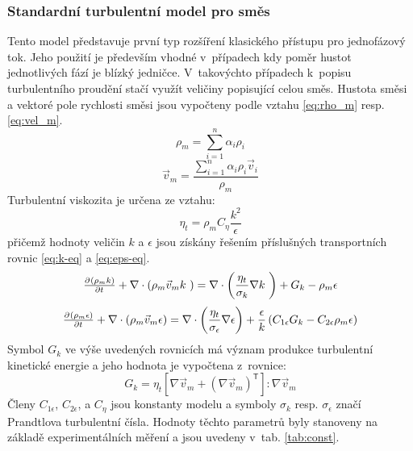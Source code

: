 \subsubsection{Standardní \kepsb{} turbulentní model pro směs}
Tento model představuje první typ rozšíření klasického \keps{} přístupu pro jednofázový tok. Jeho použití je především vhodné v~případech kdy poměr hustot jednotlivých fází je blízký jedničce. V~takovýchto případech k~popisu turbulentního proudění stačí využít veličiny popisující celou směs. Hustota směsi a vektoré pole rychlosti směsi jsou vypočteny podle vztahu \ref{eq:rho_m} resp. \ref{eq:vel_m}.
\begin{equation}
	\rho_{m} = \sum_{i=1}^n \alpha_{i}\rho_{i}
	\label{eq:rho_m}
\end{equation}  
\begin{equation}
	\vec{v}_{m} = \frac{\sum_{i=1}^n \alpha_{i}\rho_{i}\vec{v}_{i}}{\rho_{m} }
	\label{eq:vel_m}
\end{equation}  
Turbulentní viskozita je určena ze vztahu:
\begin{equation}
	\eta_{t} = \rho_{m}C_{\eta}\frac{k^{2}}{\epsilon}
	\label{eq:turb}
\end{equation}  
přičemž hodnoty veličin $k$ a $\epsilon$ jsou získány řešením příslušných transportních rovnic \ref{eq:k-eq} a \ref{eq:eps-eq}.
\begin{equation}
	\pd{\kula{\rho_{m}k}}{t} +  \nabla  \cdot \left( \rho_{m} \vec{v}_{m} k~\right) = \nabla  \cdot \left( \frac{\eta_{t}}{\sigma_{k}} \nabla k~\right) + G_{k} - \rho_{m}\epsilon
	\label{eq:k-eq}
\end{equation}  
\begin{equation}
	\pd{\kula{\rho_{m}\epsilon}}{t} +  \nabla  \cdot \left( \rho_{m} \vec{v}_{m} \epsilon \right) = \nabla  \cdot \left( \frac{\eta_{t}}{\sigma_{\epsilon}} \nabla \epsilon \right) + \frac{\epsilon}{k} \left( C_{1\epsilon}G_{k} - C_{2\epsilon}\rho_{m}\epsilon \right)
	\label{eq:eps-eq}
\end{equation}  
Symbol $G_{k}$ ve výše uvedených rovnicích má význam produkce turbulentní kinetické energie a jeho hodnota je vypočtena z~rovnice:
\begin{equation}
   G_{k} = \eta_{t} \left[ \nabla \vec{v}_{m} +  \left( \nabla \vec{v}_{m} \right)^{\mathsf{T}}\right] : \nabla \vec{v}_{m} 
  \label{eq:gk}
\end{equation} 
Členy $C_{1\epsilon}$, $C_{2\epsilon}$, a $C_{\eta}$ jsou konstanty modelu a symboly $\sigma_{k}$ resp. $\sigma_{\epsilon}$ značí Prandtlova turbulentní čísla. Hodnoty těchto parametrů byly stanoveny na základě experimentálních měření a jsou uvedeny v~tab. \ref{tab:const}.

